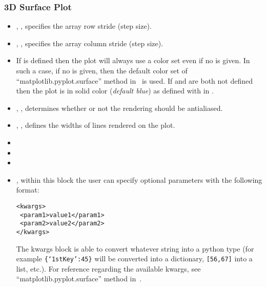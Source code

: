 \subsubsection{3D Surface Plot}
\begin{itemize}
  \item {}, , specifies the
  array row stride (step size).
  \item {}, , specifies the 
  array column stride (step size).
  \item {}
   \nb If  is defined then the plot will always use a color set even if no  is given. 
  In such a case, if no  is given, then the default color set of  ``matplotlib.pyplot.surface'' method in~\cite{MatPlotLib} is used.
  If  and  are both not defined then the plot is in solid color (\textit{default blue}) as defined with  in   .
  \item {}, , determines
  whether or not the rendering should be antialiased.
  \item {}, , defines the 
  widths of lines rendered on the plot.
  \item {}
  \item {}
  \item {}
  \item {}, within this block the user can specify optional
  parameters with the following format:

\begin{lstlisting}[style=XML]
<kwargs>
 <param1>value1</param1>
 <param2>value2</param2>
</kwargs>
\end{lstlisting}

  The kwargs block is able to convert whatever string into a python type (for
  example  \texttt{\{`1stKey':45\}} will
  be converted into a dictionary, 
   \texttt{[56,67]}  into a list, etc.).
  For reference regarding the available kwargs, see
  ``matplotlib.pyplot.surface'' method in~\cite{MatPlotLib}.
\end{itemize}


